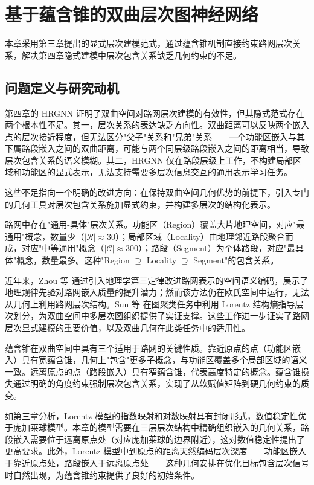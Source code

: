\chapter{基于蕴含锥的双曲层次图神经网络}

本章采用第三章提出的显式层次建模范式，通过蕴含锥机制直接约束路网层次关系，解决第四章隐式建模中层次包含关系缺乏几何约束的不足。

\section{问题定义与研究动机}

第四章的 HRGNN 证明了双曲空间对路网层次建模的有效性，但其隐式范式存在两个根本性不足。其一，层次关系的表达缺乏方向性。双曲距离可以反映两个嵌入点的层次接近程度，但无法区分"父子"关系和"兄弟"关系——一个功能区嵌入与其下属路段嵌入之间的双曲距离，可能与两个同层级路段嵌入之间的距离相当，导致层次包含关系的语义模糊。其二，HRGNN 仅在路段层级上工作，不构建局部区域和功能区的显式表示，无法支持需要多层次信息交互的通用表示学习任务。

这些不足指向一个明确的改进方向：在保持双曲空间几何优势的前提下，引入专门的几何工具对层次包含关系施加显式约束，并构建多层次的结构化表示。

路网中存在"通用-具体"层次关系。功能区（Region）覆盖大片地理空间，对应"最通用"概念，数量少（$|\mathcal{R}| \approx 30$）；局部区域（Locality）由地理邻近路段聚合而成，对应"中等通用"概念（$|\mathcal{C}| \approx 300$）；路段（Segment）为个体路段，对应"最具体"概念，数量最多。这种"Region $\supseteq$ Locality $\supseteq$ Segment"的包含关系。

近年来，Zhou 等\cite{zhou2024garner} 通过引入地理学第三定律改进路网表示的空间语义编码，展示了地理规律先验对路网嵌入质量的提升潜力；然而该方法仍在欧氏空间中运行，无法从几何上利用路网层次结构。Sun 等\cite{sun2024lsenet} 在图聚类任务中利用 Lorentz 结构熵指导层次划分，为双曲空间中多层次图组织提供了实证支撑。这些工作进一步证实了路网层次显式建模的重要价值，以及双曲几何在此类任务中的适用性。

蕴含锥在双曲空间中具有三个适用于路网的关键性质。靠近原点的点（功能区嵌入）具有宽蕴含锥，几何上"包含"更多子概念，与功能区覆盖多个局部区域的语义一致。远离原点的点（路段嵌入）具有窄蕴含锥，代表高度特定的概念。蕴含锥损失通过明确的角度约束强制层次包含关系，实现了从软赋值矩阵到硬几何约束的质变。

如第三章分析，Lorentz 模型的指数映射和对数映射具有封闭形式，数值稳定性优于庞加莱球模型。本章的模型需要在三层层次结构中精确组织嵌入的几何关系，路段嵌入需要位于远离原点处（对应庞加莱球的边界附近），这对数值稳定性提出了更高要求。此外，Lorentz 模型中到原点的距离天然编码层次深度——功能区嵌入于靠近原点处，路段嵌入于远离原点处——这种几何安排在优化目标包含层次信号时自然出现，为蕴含锥约束提供了良好的初始条件。

